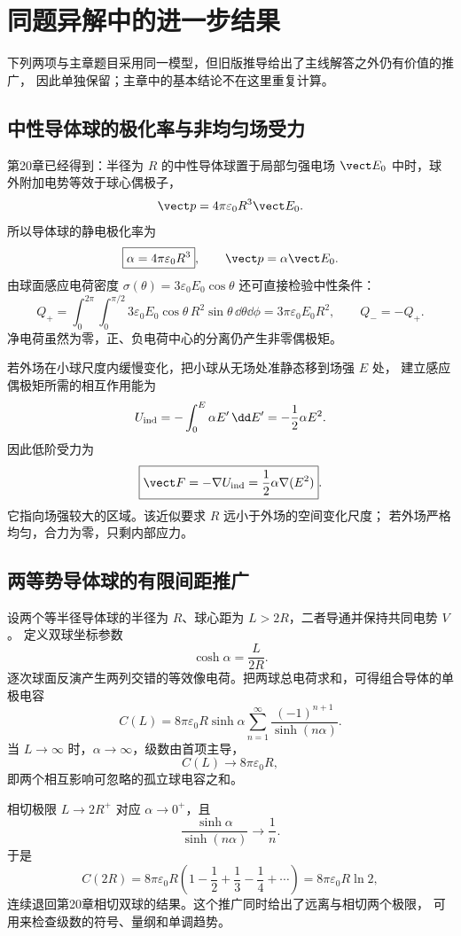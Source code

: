 \section{同题异解中的进一步结果}

下列两项与主章题目采用同一模型，但旧版推导给出了主线解答之外仍有价值的推广，
因此单独保留；主章中的基本结论不在这里重复计算。

\subsection{中性导体球的极化率与非均匀场受力}

第20章已经得到：半径为 $R$ 的中性导体球置于局部匀强电场
$\vect E_0$ 中时，球外附加电势等效于球心偶极子，
\[
 \vect p=4\pi\varepsilon_0R^3\vect E_0.
\]
所以导体球的静电极化率为
\[
 \boxed{\alpha=4\pi\varepsilon_0R^3},
 \qquad \vect p=\alpha\vect E_0.
\]
由球面感应电荷密度
$\sigma(\theta)=3\varepsilon_0E_0\cos\theta$ 还可直接检验中性条件：
\[
 Q_+=\int_0^{2\pi}\!\int_0^{\pi/2}
 3\varepsilon_0E_0\cos\theta\,R^2\sin\theta
 \,\dd\theta\dd\phi
 =3\pi\varepsilon_0E_0R^2,
 \qquad Q_-=-Q_+.
\]
净电荷虽然为零，正、负电荷中心的分离仍产生非零偶极矩。

若外场在小球尺度内缓慢变化，把小球从无场处准静态移到场强 $E$ 处，
建立感应偶极矩所需的相互作用能为
\[
 U_{\rm ind}=-\int_0^E\alpha E'\,\dd E'
 =-\frac12\alpha E^2.
\]
因此低阶受力为
\[
 \boxed{\vect F=-\nabla U_{\rm ind}
 =\frac12\alpha\nabla(E^2)}.
\]
它指向场强较大的区域。该近似要求 $R$ 远小于外场的空间变化尺度；
若外场严格均匀，合力为零，只剩内部应力。

\subsection{两等势导体球的有限间距推广}

设两个等半径导体球的半径为 $R$、球心距为 $L>2R$，二者导通并保持共同电势 $V$。
定义双球坐标参数
\[
 \cosh\alpha=\frac{L}{2R}.
\]
逐次球面反演产生两列交错的等效像电荷。把两球总电荷求和，可得组合导体的单极电容
\[
 \boxed{C(L)=8\pi\varepsilon_0R\sinh\alpha
 \sum_{n=1}^{\infty}\frac{(-1)^{n+1}}{\sinh(n\alpha)}}.
\]
当 $L\to\infty$ 时，$\alpha\to\infty$，级数由首项主导，
\[
 C(L)\longrightarrow 8\pi\varepsilon_0R,
\]
即两个相互影响可忽略的孤立球电容之和。

相切极限 $L\to2R^+$ 对应 $\alpha\to0^+$，且
\[
 \frac{\sinh\alpha}{\sinh(n\alpha)}\longrightarrow\frac1n.
\]
于是
\[
 C(2R)=8\pi\varepsilon_0R
 \left(1-\frac12+\frac13-\frac14+\cdots\right)
 =\boxed{8\pi\varepsilon_0R\ln2},
\]
连续退回第20章相切双球的结果。这个推广同时给出了远离与相切两个极限，
可用来检查级数的符号、量纲和单调趋势。
